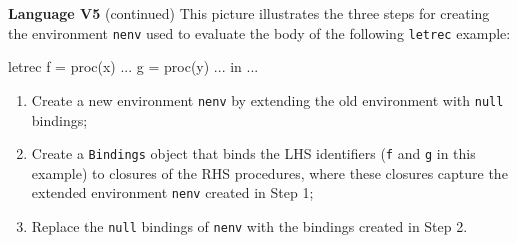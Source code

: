 \begin{minipage}[t]{\sw}
\slidenumber
\LARGE
{\bf Language V5} (continued)\exx
\large
This picture illustrates the three steps
for creating the environment \verb'nenv'
used to evaluate the body of the following \verb'letrec' example:
\begin{qv}
letrec
    f = proc(x) ...
    g = proc(y) ...
in
    ...
\end{qv}
\begin{enumerate}
\item Create a new environment \verb'nenv'
      by extending the old environment with \verb'null' bindings;
\item Create a \verb'Bindings' object that binds
      the LHS identifiers (\verb'f' and \verb'g' in this example)
      to closures of the RHS procedures,
      where these closures capture the extended environment \verb'nenv'
      created in Step 1;
\item Replace the \verb'null' bindings of \verb'nenv'
      with the bindings created in Step 2.
\end{enumerate}
{\center\ \ \\}
\end{minipage}
